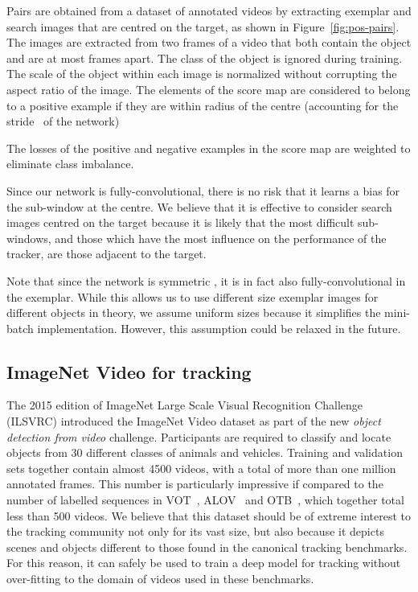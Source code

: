\documentclass[runningheads]{llncs}
\begin{document}
Pairs are obtained from a dataset of annotated videos by extracting exemplar and search images that are centred on the target, as shown in Figure~\ref{fig:pos-pairs}.
The images are extracted from two frames of a video that both contain the object and are at most  frames apart.
The class of the object is ignored during training.
The scale of the object within each image is normalized without corrupting the aspect ratio of the image.
The elements of the score map are considered to belong to a positive example if they are within radius  of the centre (accounting for the stride~ of the network)

The losses of the positive and negative examples in the score map are weighted to eliminate class imbalance.

Since our network is fully-convolutional, there is no risk that it learns a bias for the sub-window at the centre.
We believe that it is effective to consider search images centred on the target because it is likely that the most difficult sub-windows, and those which have the most influence on the performance of the tracker, are those adjacent to the target.




Note that since the network is symmetric , it is in fact also fully-convolutional in the exemplar.
While this allows us to use different size exemplar images for different objects in theory, we assume uniform sizes because it simplifies the mini-batch implementation.
However, this assumption could be relaxed in the future.

\subsection{ImageNet Video for tracking}

The 2015 edition of ImageNet Large Scale Visual Recognition Challenge~\cite{ILSVRC15} (ILSVRC) introduced the ImageNet Video dataset as part of the new \emph{object detection from video} challenge.
Participants are required to classify and locate objects from 30 different classes of animals and vehicles.
Training and validation sets together contain almost 4500 videos, with a total of more than one million annotated frames.
This number is particularly impressive if compared to the number of labelled sequences in VOT~\cite{kristan2015visual}, ALOV~\cite{smeulders2014visual} and OTB~\cite{WuLimYang13}, which together total less than 500 videos.
We believe that this dataset should be of extreme interest to the tracking community not only for its vast size, but also because it depicts scenes and objects different to those found in the canonical tracking benchmarks.
For this reason, it can safely be used to train a deep model for tracking without over-fitting to the domain of videos used in these benchmarks.
\end{document}
